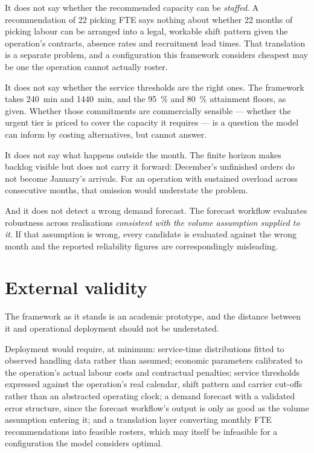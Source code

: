 It does not say whether the recommended capacity can be \emph{staffed}. A recommendation of 22
picking FTE says nothing about whether 22 months of picking labour can be arranged into a legal,
workable shift pattern given the operation's contracts, absence rates and recruitment lead
times. That translation is a separate problem, and a configuration this framework considers
cheapest may be one the operation cannot actually roster.

It does not say whether the service thresholds are the right ones. The framework takes
\SI{240}{\minute} and \SI{1440}{\minute}, and the \SI{95}{\percent} and \SI{80}{\percent}
attainment floors, as given. Whether those commitments are commercially sensible --- whether the
urgent tier is priced to cover the capacity it requires --- is a question the model can inform
by costing alternatives, but cannot answer.

It does not say what happens outside the month. The finite horizon makes backlog visible but
does not carry it forward: December's unfinished orders do not become January's arrivals.
For an operation with sustained overload across consecutive months, that omission would
understate the problem.

And it does not detect a wrong demand forecast. The forecast workflow evaluates robustness
across realisations \emph{consistent with the volume assumption supplied to it}. If that
assumption is wrong, every candidate is evaluated against the wrong month and the reported
reliability figures are correspondingly misleading.

\section{External validity}
\label{sec:external-validity}

The framework as it stands is an academic prototype, and the distance between it and
operational deployment should not be understated.

Deployment would require, at minimum: service-time distributions fitted to observed handling
data rather than assumed; economic parameters calibrated to the operation's actual labour costs
and contractual penalties; service thresholds expressed against the operation's real calendar,
shift pattern and carrier cut-offs rather than an abstracted operating clock; a demand forecast
with a validated error structure, since the forecast workflow's output is only as good as the
volume assumption entering it; and a translation layer converting monthly FTE recommendations
into feasible rosters, which may itself be infeasible for a configuration the model considers
optimal.

